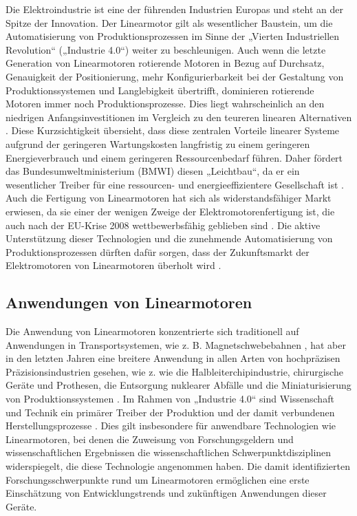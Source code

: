 \documentclass[
  oneside]{book}
\begin{document}
Die Elektroindustrie ist eine der führenden Industrien Europas und steht an der Spitze der Innovation. Der Linearmotor gilt als wesentlicher Baustein, um die Automatisierung von Produktionsprozessen im Sinne der „Vierten Industriellen Revolution`` („Industrie 4.0``) \citep{baskutis2018} weiter zu beschleunigen. Auch wenn die letzte Generation von Linearmotoren rotierende Motoren in Bezug auf Durchsatz, Genauigkeit der Positionierung, mehr Konfigurierbarkeit bei der Gestaltung von Produktionssystemen und Langlebigkeit übertrifft, dominieren rotierende Motoren immer noch Produktionsprozesse. Dies liegt wahrscheinlich an den niedrigen Anfangsinvestitionen im Vergleich zu den teureren linearen Alternativen \citep{gieras2018}. Diese Kurzsichtigkeit übersieht, dass diese zentralen Vorteile linearer Systeme aufgrund der geringeren Wartungskosten langfristig zu einem geringeren Energieverbrauch und einem geringeren Ressourcenbedarf führen. Daher fördert das Bundesumweltministerium (BMWI) diesen „Leichtbau``, da er ein wesentlicher Treiber für eine ressourcen- und energieeffizientere Gesellschaft ist \citep{bundesministeriumfurwirtschaftundenergie2021}. Auch die Fertigung von Linearmotoren hat sich als widerstandsfähiger Markt erwiesen, da sie einer der wenigen Zweige der Elektromotorenfertigung ist, die auch nach der EU-Krise 2008 wettbewerbsfähig geblieben sind \citep{ecsipconsortium}. Die aktive Unterstützung dieser Technologien und die zunehmende Automatisierung von Produktionsprozessen dürften dafür sorgen, dass der Zukunftsmarkt der Elektromotoren von Linearmotoren überholt wird \citep{gieras2018}.

\hypertarget{anwendungen-von-linearmotoren}{%
\subsection{Anwendungen von Linearmotoren}\label{anwendungen-von-linearmotoren}}

Die Anwendung von Linearmotoren konzentrierte sich traditionell auf Anwendungen in Transportsystemen, wie z. B. Magnetschwebebahnen \citep[z. ``Maglev'':][]{cassat2003, palka2021}, hat aber in den letzten Jahren eine breitere Anwendung in allen Arten von hochpräzisen Präzisionsindustrien gesehen, wie z. wie die Halbleiterchipindustrie, chirurgische Geräte und Prothesen, die Entsorgung nuklearer Abfälle und die Miniaturisierung von Produktionssystemen \citetext{\citealp[ \citet{razali2013}]{malaize2009}; \citealp{raiola2019}; \citealp{fromme2019}}. Im Rahmen von „Industrie 4.0`` sind Wissenschaft und Technik ein primärer Treiber der Produktion und der damit verbundenen Herstellungsprozesse \citep{baskutis2018}. Dies gilt insbesondere für anwendbare Technologien wie Linearmotoren, bei denen die Zuweisung von Forschungsgeldern und wissenschaftlichen Ergebnissen die wissenschaftlichen Schwerpunktdisziplinen widerspiegelt, die diese Technologie angenommen haben. Die damit identifizierten Forschungsschwerpunkte rund um Linearmotoren ermöglichen eine erste Einschätzung von Entwicklungstrends und zukünftigen Anwendungen dieser Geräte.
\end{document}
